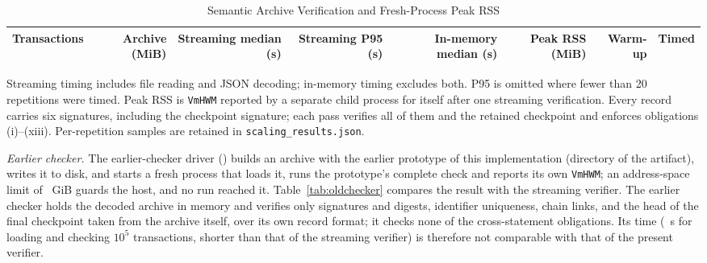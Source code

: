 \documentclass[journal]{IEEEtran}
\begin{document}
\begin{table}[!t]
\caption{Semantic Archive Verification and Fresh-Process Peak RSS}
\label{tab:scaling}
\centering
\begin{tabular}{rrrrrrrr}
\toprule
Transactions & Archive (MiB) & Streaming median (s) & Streaming P95 (s) & In-memory median (s) & Peak RSS (MiB) & Warm-up & Timed \\
\midrule

\end{tabular}
\par\smallskip\parbox{\linewidth}{\footnotesize Streaming timing includes file reading and JSON decoding; in-memory timing excludes both. P95 is omitted where fewer than 20 repetitions were timed. Peak RSS is \texttt{VmHWM} reported by a separate child process for itself after one streaming verification. Every record carries six signatures, including the checkpoint signature; each pass verifies all of them and the retained checkpoint and enforces obligations (i)--(xiii). Per-repetition samples are retained in \texttt{scaling\_results.json}.}
\end{table}

\emph{Earlier checker.} The earlier-checker driver () builds an archive with the earlier prototype of this implementation (directory  of the artifact), writes it to disk, and starts a fresh process that loads it, runs the prototype's complete check and reports its own \texttt{VmHWM}; an address-space limit of \OldAsLimitGiB~GiB guards the host, and no run reached it. Table~\ref{tab:oldchecker} compares the result with the streaming verifier. The earlier checker holds the decoded archive in memory and verifies only signatures and digests, identifier uniqueness, chain links, and the head of the final checkpoint taken from the archive itself, over its own record format; it checks none of the cross-statement obligations. Its time (\OldHundredKWall~s for loading and checking $10^5$ transactions, shorter than that of the streaming verifier) is therefore not comparable with that of the present verifier.
\end{document}

